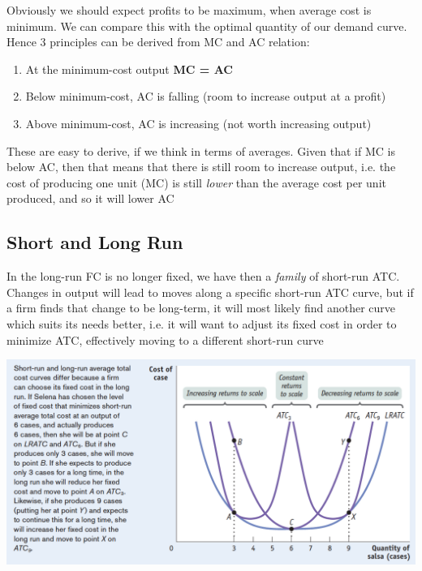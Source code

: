\documentclass[english,course]{Notes}
\newcommand{\ita}[1]{\textit{#1}}
\begin{document}
\par{Obviously we should expect profits to be maximum, when average cost is minimum. We can compare this with the optimal quantity of our demand curve. Hence 3 principles can be derived from MC and AC relation:}

\begin{enumerate}
\item At the minimum-cost output \textbf{MC = AC} 
\item Below minimum-cost, AC is falling (room to increase output at a profit)
\item Above minimum-cost, AC is increasing (not worth increasing output)
\end{enumerate}

\par{These are easy to derive, if we think in terms of averages. Given that if MC is below AC, then that means that there is still room to increase output, i.e. the cost of producing one unit (MC) is still \ita{lower} than the average cost per unit produced, and so it will lower AC}



\subsection{Short and Long Run}

\par{In the long-run FC is no longer fixed, we have then a \ita{family} of short-run ATC. Changes in output will lead to moves along a specific short-run ATC curve, but if a firm finds that change to be long-term, it will most likely find another curve which suits its needs better, i.e. it will want to adjust its fixed cost in order to minimize ATC, effectively moving to a different short-run curve}


\includegraphics[width=\textwidth]{LRATC}
\end{document}
